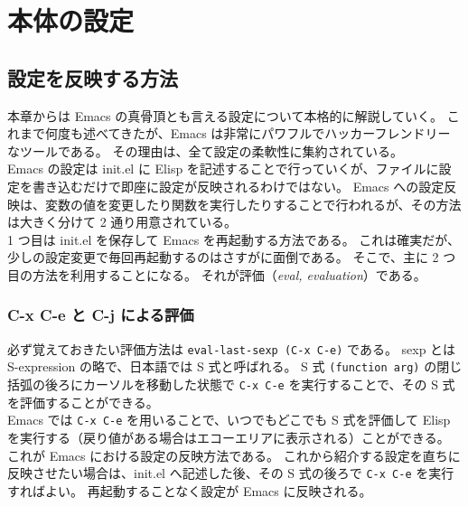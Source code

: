 \chapter{本体の設定}
\section{設定を反映する方法}
本章からは Emacs の真骨頂とも言える設定について本格的に解説していく。
これまで何度も述べてきたが、Emacs は非常にパワフルでハッカーフレンドリーなツールである。
その理由は、全て設定の柔軟性に集約されている。\\

Emacs の設定は init.el に Elisp を記述することで行っていくが、ファイルに設定を書き込むだけで即座に設定が反映されるわけではない。
Emacs への設定反映は、変数の値を変更したり関数を実行したりすることで行われるが、その方法は大きく分けて 2 通り用意されている。\\

1 つ目は init.el を保存して Emacs を再起動する方法である。
これは確実だが、少しの設定変更で毎回再起動するのはさすがに面倒である。
そこで、主に 2 つ目の方法を利用することになる。
それが評価（\emph{eval, evaluation}）である。
\subsection{C-x C-e と C-j による評価}
必ず覚えておきたい評価方法は \texttt{eval-last-sexp (C-x C-e)} である。
sexp とは S-expression の略で、日本語では S 式と呼ばれる。
S 式 \texttt{(function arg)} の閉じ括弧の後ろにカーソルを移動した状態で \texttt{C-x C-e} を実行することで、その S 式を評価することができる。\\

Emacs では \texttt{C-x C-e} を用いることで、いつでもどこでも S 式を評価して Elisp を実行する（戻り値がある場合はエコーエリアに表示される）ことができる。
これが Emacs における設定の反映方法である。
これから紹介する設定を直ちに反映させたい場合は、init.el へ記述した後、その S 式の後ろで \texttt{C-x C-e} を実行すればよい。
再起動することなく設定が Emacs に反映される。\\

